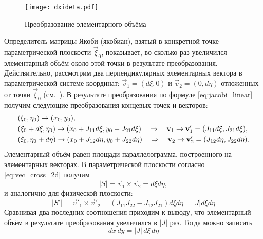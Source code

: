 \begin{figure}[h!]
\centering
\texttt{[image: dxideta.pdf]}
\caption{Преобразование элементарного объёма}
\label{fig:dxideta}
\end{figure}

Определитель матрицы Якоби (якобиан), взятый в конкретной точке параметрической плоскости $\vec\xi_0$, показывает,
во сколько раз увеличился элементарный объём около этой точки в результате преобразования.
Действительно, рассмотрим два перпендикулярных элементарных вектора
в параметрической системе координат: $\vec v_1 = (d\xi, 0)$ и $\vec v_2 = (0, d\eta)$
отложенных от точки $\vec\xi_0$ (см.~).
В результате преобразования по формуле \cref{eq:jacobi_linear} 
получим следующие преобразования концевых точек и векторов:
\begin{align*}
& (\xi_0, \eta_0) \to (x_0, y_0), \\
& (\xi_0 + d\xi, \eta_0) \to (x_0 + J_{11} d\xi, y_0 + J_{21} d\xi) \quad\Rightarrow\quad \boldsymbol{\rm v}_1 \to \boldsymbol{\rm v}'_1 = (J_{11} d\xi, J_{21} d\xi), \\
& (\xi_0 , \eta_0 + d\eta) \to (x_0 + J_{12} d\eta, y_0 + J_{22} d\eta) \quad\Rightarrow\quad \boldsymbol{\rm v}_2 \to \boldsymbol{\rm v}'_2 = (J_{12} d\eta, J_{22} d\eta).
\end{align*}
Элементарный объём равен площади параллелограмма, построенного
на элементарных векторах.
В параметрической плоскости согласно \cref{eq:vec_cross_2d} получим 
$$ |S| = \vec v_1 \times \vec v_2 = d\xi d\eta,$$
и аналогично для физической плоскости:
$$
|S'| = \vec v'_1 \times \vec v'_2 = (J_{11} J_{22} - J_{12} J_{21})d\xi d\eta = |J| d\xi d\eta
$$
Сравнивая два последних соотношения приходим к выводу,
что элементарный объём в результате преобразования увеличился в $|J|$ раз. Тогда можно записать
\begin{equation}
\label{eq:dxdy_dxideta}
dx\,dy = |J|\,d\xi\,d\eta
\end{equation}


